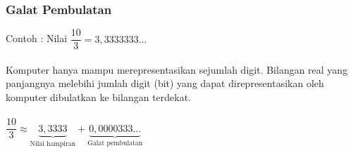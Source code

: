 \documentclass{beamer}
\begin{document}
\begin{frame}
\frametitle{Galat Pembulatan}
Contoh : Nilai $\dfrac{10}{3} = 3,3333333...$
\\\ \\Komputer hanya mampu merepresentasikan sejumlah digit. Bilangan real yang panjangnya melebihi jumlah digit (bit) yang dapat direpresentasikan oleh komputer dibulatkan ke bilangan terdekat.
\\\ \\$\dfrac{10}{3} \approx \underbrace{3,3333}_{\text{Nilai hampiran}} + \underbrace{0,0000333...}_{\text{Galat pembulatan}}$
\end{frame}

\end{document}
